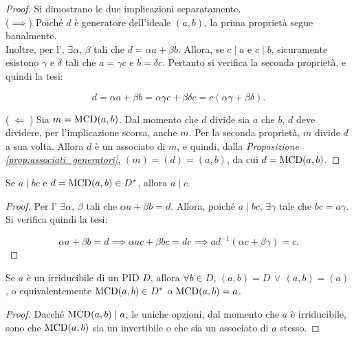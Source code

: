 \documentclass[11pt]{scrbook}
\begin{document}
\begin{proof} Si dimostrano le due implicazioni separatamente. \\

    ($\implies$) Poiché $d$ è generatore dell'ideale $(a, b)$, la prima proprietà segue banalmente. \\

    Inoltre, per l', $\exists \alpha$, $\beta$ tali che
    $d = \alpha a + \beta b$. Allora, se $c \mid a$ e $c \mid b$, sicuramente
    esistono $\gamma$ e $\delta$ tali che $a=\gamma c$ e $b=\delta c$. Pertanto
    si verifica la seconda proprietà, e quindi la tesi:

    \[ d = \alpha a + \beta b = \alpha \gamma c + \beta \delta c = c(\alpha\gamma+\beta\delta). \]

    \vskip 0.1in

    ($\;\Longleftarrow\;$) Sia $m = \operatorname{MCD}(a,b)$. Dal momento che $d$ divide
    sia $a$ che $b$, $d$ deve dividere, per l'implicazione scorsa, anche $m$.
    Per la seconda proprietà, $m$ divide $d$ a sua volta. Allora $d$ è un
    associato di $m$, e quindi, dalla \textit{Proposizione \ref{prop:associati_generatori}}, $(m)=(d)=(a,b)$, da cui $d = \operatorname{MCD}(a,b)$.
\end{proof}

\begin{proposition}
    \label{prop:divisione_gcd}
    Se $a \mid bc$ e $d = \operatorname{MCD}(a, b) \in D^*$, allora $a \mid c$.
\end{proposition}

\begin{proof}
    Per l' $\exists \alpha$, $\beta$ tali che
    $\alpha a + \beta b = d$. Allora, poiché $a \mid bc$, $\exists
        \gamma$ tale che $bc=a\gamma$. Si verifica quindi la tesi:

    \[ \alpha a + \beta b = d \implies \alpha ac + \beta bc = dc \implies
        a d^{-1} (\alpha c + \beta \gamma) = c.\]
\end{proof}

\begin{lemma}
    \label{lem:primalità_mcd}
    Se $a$ è un irriducibile di un PID $D$, allora $\forall b \in D$,
    $(a,b)=D \,\lor\, (a,b)=(a)$, o equivalentemente $\operatorname{MCD}(a,b) \in D^*$ o
    $\operatorname{MCD}(a,b) = a$.
\end{lemma}

\begin{proof}
    Dacché $\operatorname{MCD}(a,b) \mid a$, le uniche opzioni, dal momento che $a$ è irriducibile,
    sono che $\operatorname{MCD}(a,b)$ sia un invertibile o che sia un associato
    di $a$ stesso.
\end{proof}
\end{document}

